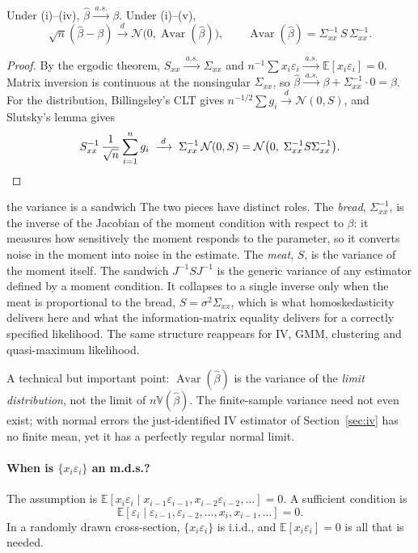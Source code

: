 \documentclass[11pt,a4paper]{article}
\newcommand{\E}{\mathbb{E}}
\newcommand{\V}{\mathbb{V}}
\newcommand{\N}{\mathcal{N}}
\newcommand{\Avar}{\operatorname{Avar}}
\newcommand{\cd}{\xrightarrow{\;d\;}}
\newcommand{\cas}{\xrightarrow{\;a.s.\;}}
\newcommand{\bh}{\hat\beta}
\newcommand{\Sxx}{S_{xx}}
\newcommand{\sxx}{\Sigma_{xx}}
\newcommand{\iid}{i.i.d.}
\begin{document}
\begin{theorem}\label{thm:ols_asy}
Under (i)--(iv), $\bh\cas\beta$. Under (i)--(v),
\begin{equation}\label{eq:avar}
\sqrt n(\bh-\beta)\cd\N\big(0,\Avar(\bh)\big),\qquad \Avar(\bh)=\sxx^{-1}\,S\,\sxx^{-1}.
\end{equation}
\end{theorem}

\begin{proof}
By the ergodic theorem, $\Sxx\cas\sxx$ and $n^{-1}\sum x_i\varepsilon_i\cas\E[x_i\varepsilon_i]=0$. Matrix inversion is continuous at the nonsingular $\sxx$, so $\bh\cas\beta+\sxx^{-1}\cdot0=\beta$. For the distribution, Billingsley's CLT gives $n^{-1/2}\sum g_i\cd\N(0,S)$, and Slutsky's lemma gives
\[
\Sxx^{-1}\,\frac{1}{\sqrt n}\sum_{i=1}^n g_i\;\cd\;\sxx^{-1}\,\N(0,S)=\N\big(0,\;\sxx^{-1}S\sxx^{-1}\big).\qedhere
\]
\end{proof}

\begin{whybox}{the variance is a sandwich}
The two pieces have distinct roles. The \emph{bread}, $\sxx^{-1}$, is the inverse of the Jacobian of the moment condition with respect to $\beta$: it measures how sensitively the moment responds to the parameter, so it converts noise in the moment into noise in the estimate. The \emph{meat}, $S$, is the variance of the moment itself. The sandwich $J^{-1}SJ^{-1}$ is the generic variance of any estimator defined by a moment condition. It collapses to a single inverse only when the meat is proportional to the bread, $S=\sigma^2\sxx$, which is what homoskedasticity delivers here and what the information-matrix equality delivers for a correctly specified likelihood. The same structure reappears for IV, GMM, clustering and quasi-maximum likelihood.
\end{whybox}

A technical but important point: $\Avar(\bh)$ is the variance of the \emph{limit distribution}, not the limit of $n\V(\bh)$. The finite-sample variance need not even exist; with normal errors the just-identified IV estimator of Section~\ref{sec:iv} has no finite mean, yet it has a perfectly regular normal limit.

\paragraph{When is $\{x_i\varepsilon_i\}$ an m.d.s.?}
The assumption is $\E[x_i\varepsilon_i\mid x_{i-1}\varepsilon_{i-1},x_{i-2}\varepsilon_{i-2},\dots]=0$. A sufficient condition is
\[
\E[\varepsilon_i\mid\varepsilon_{i-1},\varepsilon_{i-2},\dots,x_i,x_{i-1},\dots]=0 .
\]
In a randomly drawn cross-section, $\{x_i\varepsilon_i\}$ is \iid, and $\E[x_i\varepsilon_i]=0$ is all that is needed.
\end{document}
